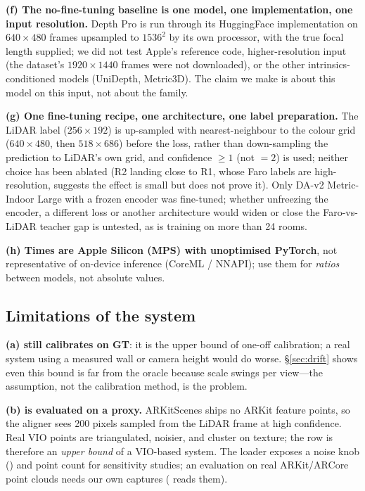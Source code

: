 \textbf{(f) The no-fine-tuning baseline is one model, one implementation, one input resolution.} Depth Pro is run through
its HuggingFace implementation on $640\times480$ frames upsampled to $1536^2$ by its own processor, with the true
focal length supplied; we did not test Apple's reference code, higher-resolution input (the dataset's
$1920\times1440$ frames were not downloaded), or the other intrinsics-conditioned models (UniDepth, Metric3D).
The claim we make is about this model on this input, not about the family.

\textbf{(g) One fine-tuning recipe, one architecture, one label preparation.} The LiDAR label ($256\times192$) is
up-sampled with nearest-neighbour to the colour grid ($640\times480$, then $518\times686$) before the loss, rather than
down-sampling the prediction to LiDAR's own grid, and confidence $\geq 1$ (not $=2$) is used; neither choice has been
ablated (R2 landing close to R1, whose Faro labels are high-resolution, suggests the effect is small but does not prove
it). Only DA-v2 Metric-Indoor Large with a frozen encoder was fine-tuned; whether unfreezing the encoder, a different loss or another architecture would widen or close the
Faro-vs-LiDAR teacher gap is untested, as is training on more than 24 rooms.

\textbf{(h) Times are Apple Silicon (MPS) with unoptimised PyTorch}, not representative of on-device inference
(CoreML / NNAPI); use them for \emph{ratios} between models, not absolute values.

\subsection{Limitations of the system}
\textbf{(a)  still calibrates on GT}: it is the upper bound of one-off calibration; a real system
using a measured wall or camera height would do worse. \S\ref{sec:drift} shows even this bound is far from the oracle
because scale swings per view---the assumption, not the calibration method, is the problem.

\textbf{(b)  is evaluated on a proxy.} ARKitScenes ships no ARKit feature points, so the aligner sees
200 pixels sampled from the LiDAR frame at high confidence. Real VIO points are triangulated, noisier, and cluster on
texture; the row is therefore an \emph{upper bound} of a VIO-based system. The loader exposes a noise knob
() and point count for sensitivity studies; an evaluation on real ARKit/ARCore point clouds needs
our own captures ( reads them).

